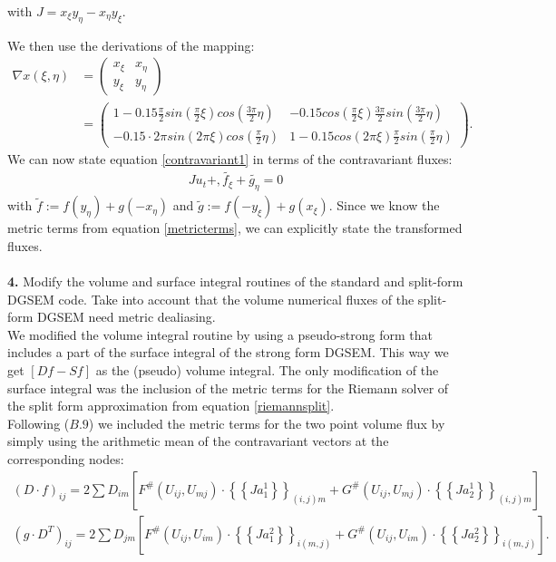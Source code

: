 \documentclass[11pt]{scrartcl}
\begin{document}
with $J= x_\xi y_\eta - x_\eta y_\xi $.

We then use the derivations of the mapping:
\begin{align}
\nabla x(\xi, \eta) &= 
\begin{pmatrix}
x_\xi & x_\eta\\
y_\xi & y_\eta
\end{pmatrix} \nonumber \\ &=
\begin{pmatrix}
1 - 0.15 \frac{\pi}{2} sin(\frac{\pi}{2}\xi) cos(\frac{3\pi}{2} \eta) &
- 0.15 cos(\frac{\pi}{2}\xi) \frac{3\pi}{2} sin(\frac{3\pi}{2} \eta) \\
- 0.15 \cdot 2\pi sin(2\pi\xi) cos(\frac{\pi}{2} \eta) &
1 - 0.15 cos(2\pi \xi) \frac{\pi}{2}  sin(\frac{\pi}{2} \eta)
\end{pmatrix}.
\label{metricterms}
\end{align}
We can now state equation \ref{contravariant1} in terms of the contravariant fluxes:
\begin{align}
 J u_t + ,\tilde{f_\xi} + \tilde{g_\eta} = 0
 \label{contravariantequation}
\end{align}
with $\tilde{f} := f(y_\eta) + g(-x_\eta)$ and $\tilde{g} := f(-y_\xi) + g(x_\xi)$. Since we know the metric terms from equation \ref{metricterms}, we can explicitly state the transformed fluxes. \\ \ \\
\textbf{4.} Modify the volume and surface integral routines of the standard and split-form DGSEM code. Take into account that the volume numerical fluxes of the split-form DGSEM need metric dealiasing.\\

We modified the volume integral routine by using a pseudo-strong form that includes a part of the surface integral of the strong form DGSEM. This way we get $[Df - Sf]$ as the (pseudo) volume integral. The only modification of the surface integral was the inclusion of the metric terms for the Riemann solver of the split form approximation from equation \ref{riemannsplit}. \\
Following \cite{Gassner_2016} ($B.9$) we included the metric terms for the two point volume flux by simply using the arithmetic mean of the contravariant vectors at the corresponding nodes:
\begin{align*}
(D \cdot f)_{ij} = 2 \sum D_{im} \left[ F^{\#}(U_{ij}, U_{mj}) \cdot \left\{\left\{ Ja^1_1 \right\}\right\}_{(i,j)m} + G^{\#}(U_{ij}, U_{mj}) \cdot \left\{\left\{ Ja^1_2 \right\}\right\}_{(i,j)m} \right] \\
(g \cdot D^T)_{ij} = 2 \sum D_{jm} \left[ F^{\#}(U_{ij}, U_{im}) \cdot \left\{\left\{ Ja^2_1 \right\}\right\}_{i(m,j)} + G^{\#}(U_{ij}, U_{im}) \cdot \left\{\left\{ Ja^2_2 \right\}\right\}_{i(m,j)} \right].
\end{align*}
\end{document}
